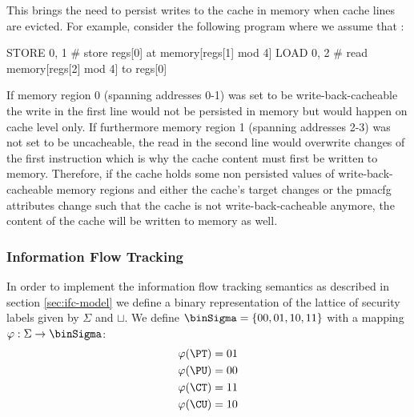 This brings the need to persist writes to the cache in memory when cache lines are evicted.
For example, consider the following program where we assume that :
\begin{assmblr}
STORE 0, 1  # store regs[0] at memory[regs[1] mod 4]
LOAD 0, 2   # read memory[regs[2] mod 4] to regs[0]
\end{assmblr}

If memory region 0 (spanning addresses 0-1) was set to be write-back-cacheable the write in the first line would not be persisted in memory but would happen on cache level only.
If furthermore memory region 1 (spanning addresses 2-3) was not set to be uncacheable, the read in the second line would overwrite changes of the first instruction which is why the cache content must first be written to memory.
Therefore, if the cache holds some non persisted values of write-back-cacheable memory regions and either the cache's target changes or the \gls{pmacfg} attributes change such that the cache is not write-back-cacheable anymore, the content of the cache will be written to memory as well.

\subsubsection{Information Flow Tracking}
\label{sec:ifc-implementation}

In order to implement the information flow tracking semantics as described in section \ref{sec:ifc-model} we define a binary representation of the lattice of security labels given by $ \Sigma $ and $ \sqcup $.
We define $ \binSigma = \{ 00, 01, 10, 11 \}$ with a mapping $ \varphi : \Sigma \rightarrow \binSigma $:
\begin{align*}
    \varphi(\PT) &= 01 \\
    \varphi(\PU) &= 00 \\
    \varphi(\CT) &= 11 \\
    \varphi(\CU) &= 10
\end{align*}

